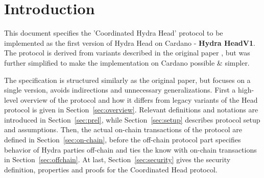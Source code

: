 \section{Introduction}
This document specifies the 'Coordinated Hydra Head' protocol to be implemented as the first version of Hydra Head on Cardano - \textbf{Hydra HeadV1}. The protocol is derived from variants described in the original paper \cite{hydrahead20}, but was further simplified to make the implementation on Cardano possible \& simpler.

The specification is structured similarly as the original paper, but focuses on a single version, avoids indirections and unnecessary generalizations. First a high-level overview of the protocol and how it differs from legacy variants of the Head protocol is given in Section~\ref{sec:overview}. Relevant definitions and notations are introduced in Section~\ref{sec:prel}, while Section~\ref{sec:setup} describes protocol setup and assumptions. Then, the actual on-chain transactions of the protocol are defined in Section~\ref{sec:on-chain}, before the off-chain protocol part specifies behavior of Hydra parties off-chain and ties the know with on-chain transactions in Section~\ref{sec:offchain}. At last, Section~\ref{sec:security} gives the security definition, properties and proofs for the Coordinated Head protocol. 

